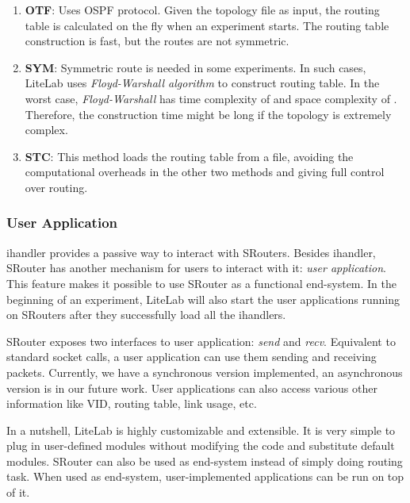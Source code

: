\documentclass[conference]{IEEEtran}
\begin{document}
\begin{enumerate}

\item \textbf{OTF}: Uses OSPF\cite{RFC2328} protocol. Given the
  topology file as input, the routing table is calculated on the fly
  when an experiment starts. The routing table construction is fast,
  but the routes are not symmetric.

\item \textbf{SYM}: Symmetric route is needed in some experiments. In
  such cases, LiteLab uses \textit{Floyd-Warshall
    algorithm}\cite{Floyd:1962:A9A:367766.368166} to construct routing
  table. In the worst case, \textit{Floyd-Warshall} has time
  complexity of  and space complexity of .
  Therefore, the construction time might be long if the topology is
  extremely complex.

\item \textbf{STC}: This method loads the routing table from a file,
  avoiding the computational overheads in the other two methods and
  giving full control over routing.


\end{enumerate}



\subsubsection{User Application}
ihandler provides a passive way to interact with SRouters.  Besides
ihandler, SRouter has another mechanism for users to interact with it:
\textit{user application}. This feature makes it possible to use
SRouter as a functional end-system. In the beginning of an experiment,
LiteLab will also start the user applications running on SRouters
after they successfully load all the ihandlers.

SRouter exposes two interfaces to user application: \textit{send} and
\textit{recv}. Equivalent to standard socket calls, a user application
can use them sending and receiving packets. Currently, we have a
synchronous version implemented, an asynchronous version is in our
future work. User applications can also access various other
information like VID, routing table, link usage, etc.




In a nutshell, LiteLab is highly customizable and extensible. It is
very simple to plug in user-defined modules without modifying the code
and substitute default modules.
SRouter can also be used as end-system instead of simply doing routing
task. When used as end-system, user-implemented applications can be
run on top of
it. 
\end{document}
